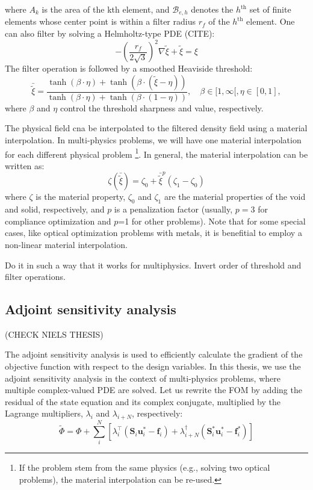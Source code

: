 where $A_k$ is the area of the kth element, and $\mathcal{B}_{e, h}$ denotes the
$h^\text{th}$ set of finite elements whose center point is within a filter radius $r_f$ of the
$h^\text{th}$ element. One can also filter by solving a Helmholtz-type PDE (CITE):
\begin{equation}
    -\left(\frac{r_f}{2 \sqrt{3}}\right)^2 \nabla \tilde{\xi}+\tilde{\xi}=\xi
\end{equation}
The filter operation is followed by a smoothed Heaviside threshold:
\begin{equation}
    \bar{\tilde{\xi}}=\frac{\tanh (\beta \cdot \eta)+\tanh (\beta \cdot(\tilde{\xi}-\eta))}{\tanh (\beta \cdot \eta)+\tanh (\beta \cdot(1-\eta))}, \quad \beta \in[1, \infty[, \eta \in[0,1],
\end{equation}
where $\beta$ and $\eta$ control the threshold sharpness and value, respectively.

The physical field cna be interpolated to the filtered density field using a material interpolation.
In multi-physics problems, we will have one material interpolation for each different physical problem
\footnote{If the problem stem from the same physics (e.g., solving two optical problems), the material interpolation can be re-used.}.
In general, the material interpolation can be written as:
\begin{equation}
    \zeta(\bar{\tilde{\xi}})=\zeta_0+\bar{\tilde{\xi}}^p\left(\zeta_1-\zeta_0\right)
\end{equation}
where $\zeta$ is the material property, $\zeta_0$ and $\zeta_1$ are the material properties of the void and solid, respectively, and $p$
is a penalization factor (usually, $p=3$ for compliance optimization and $p$=1 for other problems). Note that for some
special cases, like optical optimization problems with metals, it is benefitial to employ a non-linear material interpolation.

Do it in such a way that it works for multiphysics.
Invert order of threshold and filter operations.

\subsection{Adjoint sensitivity analysis}

(CHECK NIELS THESIS)

The adjoint sensitivity analysis is used to efficiently calculate the gradient of the objective function with 
respect to the design variables. In this thesis, we use the adjoint sensitivity analysis  in the context of 
multi-physics problems, where multiple complex-valued PDE are solved. Let us rewrite the FOM by adding the residual
of the state equation and its complex conjugate, multiplied by the Lagrange multipliers, $\lambda_i$ and $\lambda_{i+N}$, 
respectively:
\begin{equation}
    \tilde{\Phi} =\Phi + \sum^N_i \left[ \lambda_{i}^{\top}\left(\mathbf{S}_i \mathbf{u}^*_i -\mathbf{f}_i\right) + 
    \lambda_{i+N}^{\dagger}\left(\mathbf{S}_{i}^* \mathbf{u}^*_i -\mathbf{f}_i^*\right) \right]
\end{equation}

